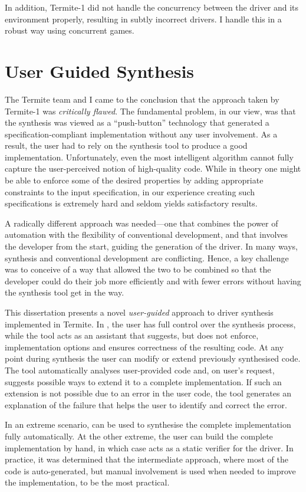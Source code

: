In addition, Termite-1 did not handle the concurrency between the driver and its environment properly, resulting in subtly incorrect drivers. I handle this in a robust way using concurrent games. 


\section{User Guided Synthesis}

The Termite team and I came to the conclusion that the approach taken by Termite-1 was \emph{critically flawed}.  The fundamental problem, in our view, was that the synthesis was viewed as a ``push-button'' technology that generated a specification-compliant implementation without any user involvement.  As a result, the user had to rely on the synthesis tool to produce a good implementation.  Unfortunately, even the most intelligent algorithm cannot fully capture the user-perceived notion of high-quality code.  While in theory one might be able to enforce some of the desired properties by adding appropriate constraints to the input specification, in our experience creating such specifications is extremely hard and seldom yields satisfactory results.

A radically different approach was needed---one that combines the power of automation with the flexibility of conventional development, and that involves the developer from the start, guiding the generation of the driver.  In many ways, synthesis and conventional development are conflicting.  Hence, a key challenge was to conceive of a way that allowed the two to be combined so that the developer could do their job more efficiently and with fewer errors without having the synthesis tool get in the way.

This dissertation presents a novel \emph{user-guided} approach to driver synthesis implemented in Termite.  In \termite, the user has full control over the synthesis process, while the tool acts as an assistant that suggests, but does not enforce, implementation options and ensures correctness of the resulting code.  At any point during synthesis the user can modify or extend previously synthesised code.  The tool automatically analyses user-provided code and, on user's request, suggests possible ways to extend it to a complete implementation.  If such an extension is not possible due to an error in the user code, the tool generates an explanation of the failure that helps the user to identify and correct the error.

In an extreme scenario, \termite can be used to synthesise the complete implementation fully automatically.  At the other extreme, the user can build the complete implementation by hand, in which case \termite acts as a static verifier for the driver.  In practice, it was determined that the intermediate approach, where most of the code is auto-generated, but manual involvement is used when needed to improve the implementation, to be the most practical.

